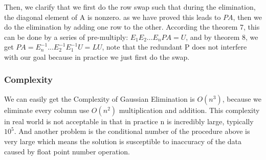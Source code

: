 \documentclass[11pt]{article}
\begin{document}
Then, we clarify that we first do the row swap such that during the elimination, the diagonal element of A is nonzero. as we have proved this leads to $PA$, then we do the elimination by adding one row to the other. According the theorem 7, this can be done by a series of pre-multiply: $E_{1}E_{2}...E_{n}PA=U$, and by theorem 8, we get $PA=E_{n}^{-1}...E_{2}^{-1}E_{1}^{-1}U=LU$, note that the redundant P does not interfere with our goal because in practice we just first do the swap.
\subsubsection{Complexity}
We can easily get the Complexity of Gaussian Elimination is $O(n^3)$, because we eliminate every column use $O(n^2)$ multiplication and addition. This complexity in real world is not acceptable in that in practice n is incredibly large, typically $10^5$. And another problem is the conditional number of the procedure above is very large which means the solution is susceptible to inaccuracy of the data caused by float point number operation.
\end{document}
